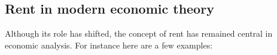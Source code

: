 
\subsection{Rent in modern economic theory}
Although its role has shifted, the concept of rent has remained central in economic analysis. For instance here are a few examples: 
